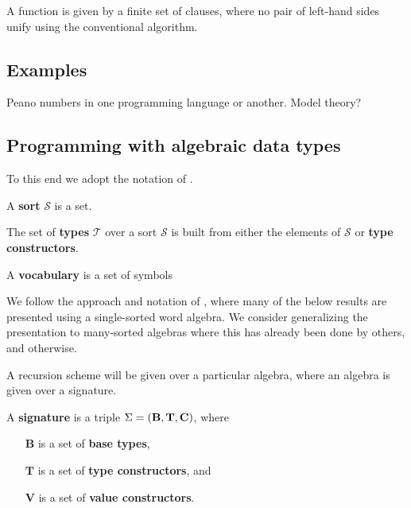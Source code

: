 \begin{definition} A function is given by a finite set of clauses, where no
pair of left-hand sides unify using the conventional algorithm.
\end{definition}

\subsection{Examples}

\begin{example} Peano numbers in one programming language or another. Model
theory? \end{example}

\subsection{Programming with algebraic data types}

To this end we adopt the notation of \cite{marion-2003}.

\begin{definition} A \textbf{sort} $\mathcal{S}$ is a set. \end{definition}

\begin{specification} The set of \textbf{types} $\mathcal{T}$ over a sort
$\mathcal{S}$ is  built from either the elements of $\mathcal{S}$ or
\textbf{type constructors}. \end{specification}

\begin{definition} A \textbf{vocabulary} is a set of symbols \end{definition} 

We follow the approach and notation of \cite{clote-1999}, where many of the
below results are presented using a single-sorted word algebra. We consider
generalizing the presentation to many-sorted algebras where this has already
been done by others, and otherwise.

A recursion scheme will be given over a particular algebra, where an algebra is
given over a signature.

\begin{definition} A \textbf{signature} is a triple $\Sigma = {\mathopen{}\left({\mathbf{B},
\mathbf{T}, \mathbf{C}}\right)\mathclose{}}$, where

\begin{enumerate}

\item [$\mathbf{B}$] is a set of \textbf{base types},

\item [$\mathbf{T}$] is a set of \textbf{type constructors}, and

\item [$\mathbf{V}$] is a set of \textbf{value constructors}.

\end{enumerate}

\end{definition}

